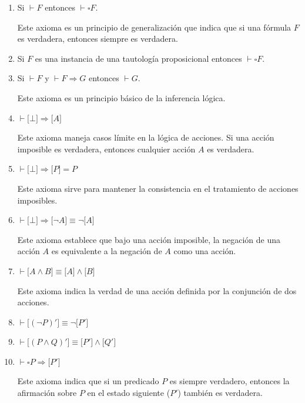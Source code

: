 \begin{enumerate}
    \item Si $\vdash F $ entonces $\vdash \square F $.

    Este axioma es un principio de generalización que indica que si una fórmula $F$ es verdadera, entonces siempre es verdadera.
    
    \item Si $ F $ es una instancia de una tautología proposicional entonces $\vdash \square F $.
    
    \item Si $ \vdash F $ y $ \vdash F \Rightarrow G $ entonces $ \vdash G $.

    Este axioma es un principio básico de la inferencia lógica.
    
    \item $ \vdash \lbrack \bot \rbrack \Rightarrow \lbrack A \rbrack $

    Este axioma maneja casos límite en la lógica de acciones. Si una acción imposible es verdadera, entonces cualquier acción $A$ es verdadera.
    
    \item $ \vdash \lbrack \bot \rbrack \Rightarrow \lbrack P \rbrack = P $

    Este axioma sirve para mantener la consistencia en el tratamiento de acciones imposibles.
    
    \item $ \vdash \lbrack \bot \rbrack \Rightarrow \lbrack \neg A \rbrack \equiv \neg \lbrack A \rbrack $

    Este axioma establece que bajo una acción imposible, la negación de una acción $A$ es equivalente a la negación de $A$ como una acción.
    
    \item $ \vdash \lbrack A \land B \rbrack \equiv \lbrack A \rbrack \land \lbrack B \rbrack $

    Este axioma indica la verdad de una acción definida por la conjunción de dos acciones.
    
    \item $ \vdash \lbrack (\neg P)' \rbrack \equiv \neg \lbrack P' \rbrack $

    \item $ \vdash \lbrack (P \land Q)' \rbrack \equiv \lbrack P' \rbrack \land \lbrack Q' \rbrack $
    \item $ \vdash \square P \Rightarrow \lbrack P' \rbrack $

    Este axioma indica que si un predicado $P$ es siempre verdadero, entonces la afirmación sobre $P$ en el estado siguiente ($P'$) también es verdadera.
    

\end{enumerate}
